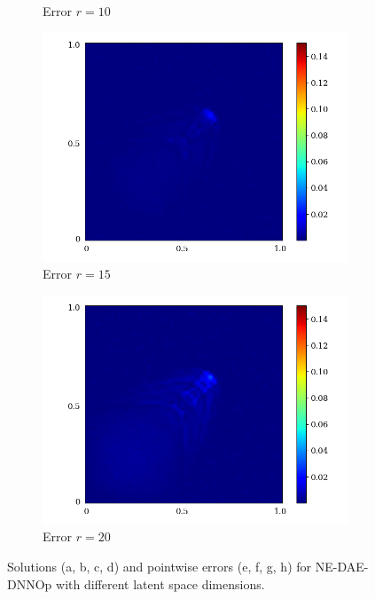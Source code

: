 \begin{figure}[ht!]
\begin{center}
\begin{subfigure}[b]{0.20\textwidth}
\begin{center}
            \end{center}
            \caption{Error $r = 10$}
        \end{subfigure}   
        \begin{subfigure}[b]{0.20\textwidth}
            \begin{center}
            \includegraphics[trim = {0, 0, 3cm, 0}, clip, width=\textwidth]{Pictures/X-rom-NE-DAE-15-abs-err.png}
            \end{center}
            \caption{Error $r = 15$}
        \end{subfigure}    
        \begin{subfigure}[b]{0.20\textwidth}
            \begin{center}
                \includegraphics[trim = {0, 0, 3cm, 0}, clip, width=\textwidth]{Pictures/X-rom-NE-DAE-20-abs-err.png}
            \end{center}
            \caption{Error $r = 20$}
        \end{subfigure}
     \end{center}
     \caption[Solutions and pointwise errors for NE-DAE-DNNOp.]{Solutions (a, b, c, d) and pointwise errors (e, f, g, h) for NE-DAE-DNNOp with different latent space dimensions.}
        \label{fig: nedae-burger}
\end{figure}

